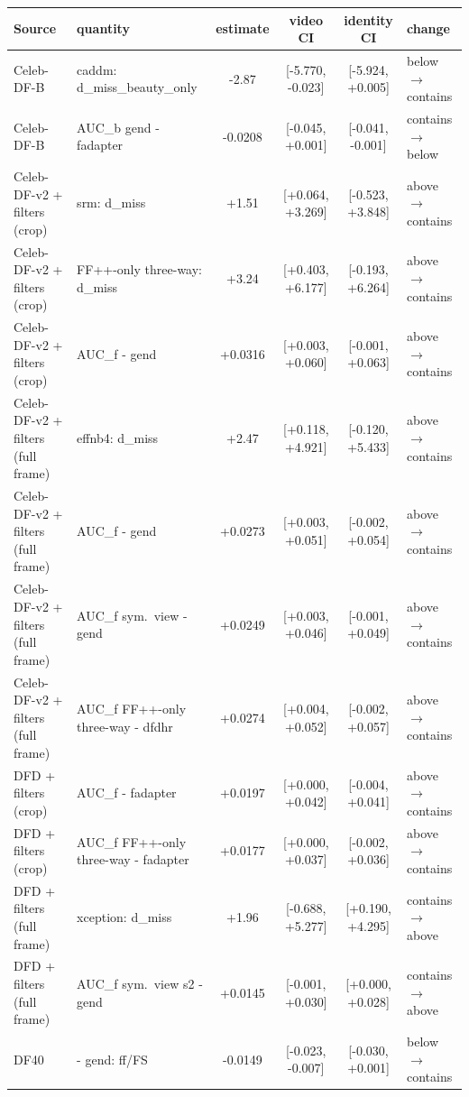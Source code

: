 \begin{tabular}{@{}l l c c c l@{}}
\toprule
Source & quantity & estimate & video CI & identity CI & change \\
\midrule
Celeb-DF-B & caddm: d\_miss\_beauty\_only & -2.87 & [-5.770, -0.023] & [-5.924, +0.005] & below $\rightarrow$ contains \\
Celeb-DF-B & AUC\_b gend - fadapter & -0.0208 & [-0.045, +0.001] & [-0.041, -0.001] & contains $\rightarrow$ below \\
Celeb-DF-v2 + filters (crop) & srm: d\_miss & +1.51 & [+0.064, +3.269] & [-0.523, +3.848] & above $\rightarrow$ contains \\
Celeb-DF-v2 + filters (crop) & FF++-only three-way: d\_miss & +3.24 & [+0.403, +6.177] & [-0.193, +6.264] & above $\rightarrow$ contains \\
Celeb-DF-v2 + filters (crop) & AUC\_f \oursF{} - gend & +0.0316 & [+0.003, +0.060] & [-0.001, +0.063] & above $\rightarrow$ contains \\
Celeb-DF-v2 + filters (full frame) & effnb4: d\_miss & +2.47 & [+0.118, +4.921] & [-0.120, +5.433] & above $\rightarrow$ contains \\
Celeb-DF-v2 + filters (full frame) & AUC\_f \oursB{} - gend & +0.0273 & [+0.003, +0.051] & [-0.002, +0.054] & above $\rightarrow$ contains \\
Celeb-DF-v2 + filters (full frame) & AUC\_f sym.\ view - gend & +0.0249 & [+0.003, +0.046] & [-0.001, +0.049] & above $\rightarrow$ contains \\
Celeb-DF-v2 + filters (full frame) & AUC\_f FF++-only three-way - dfdhr & +0.0274 & [+0.004, +0.052] & [-0.002, +0.057] & above $\rightarrow$ contains \\
DFD + filters (crop) & AUC\_f \oursF{} - fadapter & +0.0197 & [+0.000, +0.042] & [-0.004, +0.041] & above $\rightarrow$ contains \\
DFD + filters (crop) & AUC\_f FF++-only three-way - fadapter & +0.0177 & [+0.000, +0.037] & [-0.002, +0.036] & above $\rightarrow$ contains \\
DFD + filters (full frame) & xception: d\_miss & +1.96 & [-0.688, +5.277] & [+0.190, +4.295] & contains $\rightarrow$ above \\
DFD + filters (full frame) & AUC\_f sym.\ view s2 - gend & +0.0145 & [-0.001, +0.030] & [+0.000, +0.028] & contains $\rightarrow$ above \\
DF40 & \oursF{} - gend: ff/FS & -0.0149 & [-0.023, -0.007] & [-0.030, +0.001] & below $\rightarrow$ contains \\

\end{tabular}
